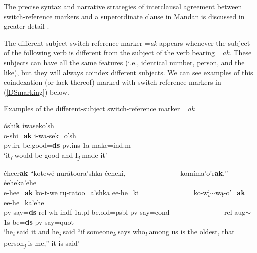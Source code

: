 The precise syntax and narrative strategies of interclausal agreement between switch-reference markers and a superordinate clause in Mandan is discussed in greater detail .

\label{SecDSmarker}

The different-subject switch-reference marker =\textit{ak} appears whenever the subject of the following verb is different from the subject of the verb bearing \textit{=ak}. These subjects can have all the same features (i.e., identical number, person, and the like), but they will always coindex different subjects. We can see examples of this coindexation (or lack thereof) marked with switch-reference markers in (\ref{DSmarking}) below.

\begin{exe}

\item\label{DSmarking} Examples of the different-subject switch-reference marker =\textit{ak}

	\begin{xlist}
	
	\item\label{DSmarking1}
	\glll óshi\textbf{k} íwaseko'sh\\
	o-shi=\textbf{ak} i-wa-sek=o'sh\\
	pv.irr-\textnormal{be.good}=\textbf{ds} pv.ins-1a-\textnormal{make}=ind.m\\
	\glt `it\textsubscript{\textit{i}} would be good and I\textsubscript{\textit{j}} made it' \citep[4]{hollow1973a}

	\item\label{DSmarking2}
	\glll éheer\textbf{ak} ``kotewé nurátoora'shka éeheki, ~ ~ ~ ~ ~ ~ ~ ~ ~ komíma'o'r\textbf{ak},'' éeheka'ehe\\
	e-hee=\textbf{ak} ko-t-we rų-ratoo=a'shka ee-he=ki ~ ~ ~ ~ ~ ~ ~ ~ ~ ko-wį$\sim$wą-o'=\textbf{ak} ee-he=ka'ehe\\
	pv-\textnormal{say}=\textbf{ds} rel-wh-indf 1a.pl-\textnormal{be.old}=psbl pv-\textnormal{say}=cond ~ ~ ~ ~ ~ ~ ~ ~ ~ rel-aug$\sim$1s-\textnormal{be}=\textbf{ds} pv-\textnormal{say}=quot\\
	\glt `he\textsubscript{\textit{i}} said it and he\textsubscript{\textit{j}} said ``if someone\textsubscript{\textit{k}} says who\textsubscript{\textit{l}} among us is the oldest, that person\textsubscript{\textit{j}} is me,'' it is said' \citep[6]{hollow1973a}


\end{xlist}
\end{exe}

